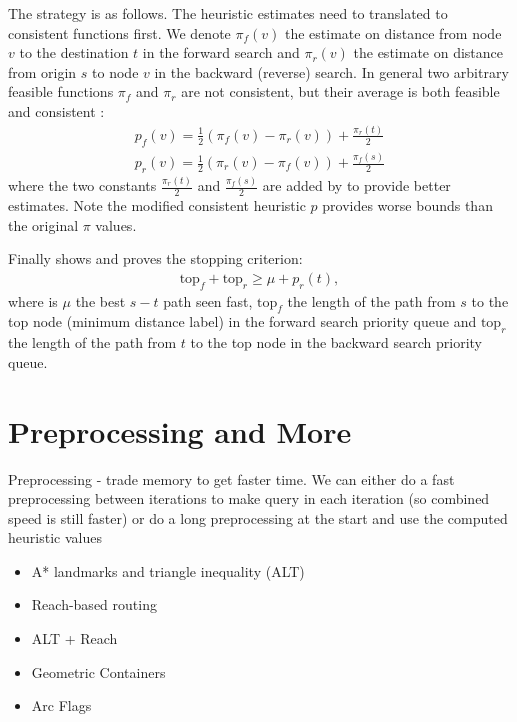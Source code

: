 The strategy is as follows. The heuristic estimates need to translated to consistent functions first. 
We denote $\pi_f(v)$ the estimate on distance from node $v$ to the destination $t$ in the forward search and $\pi_r(v)$ the estimate on distance from origin $s$ to node $v$ in the backward (reverse) search.
In general two arbitrary feasible functions $\pi_f$ and $\pi_r$ are not consistent, but their average is both feasible and consistent \citep{Ikeda}:
\begin{align}
    p_f(v) = \frac{1}{2}(\pi_f(v)-\pi_r(v)) + \frac{\pi_r(t)}{2} \\
    p_r(v) = \frac{1}{2}(\pi_r(v)-\pi_f(v)) + \frac{\pi_f(s)}{2} 
\end{align}
where the two constants $\frac{\pi_r(t)}{2}$ and $\frac{\pi_f(s)}{2}$ are added by \citet{GoldbergEPP} to provide better estimates.
Note the modified consistent heuristic $p$ provides worse bounds than the original $\pi$ values.

Finally \citet{GoldbergEPP} shows and proves the stopping criterion:
\begin{align}
    \text{top}_f + \text{top}_r \geq \mu + p_r(t),
\end{align}
where is $\mu$ the best $s-t$ path seen fast, $\text{top}_f$ the length of the path from $s$ to the top node (minimum distance label) in the forward search priority queue and $\text{top}_r$ the length of the path from $t$ to the top node in the backward search priority queue.



\newpage
{}
\section{Preprocessing and More}
Preprocessing - trade memory to get faster time.
We can either do a fast preprocessing between iterations to make query in each iteration (so combined speed is still faster) 
or do a long preprocessing at the start and use the computed heuristic values
\begin{itemize}
    \item A* landmarks and triangle inequality (ALT)
    \item Reach-based routing 
    \item ALT + Reach
    \item Geometric Containers
    \item Arc Flags
\end{itemize}


